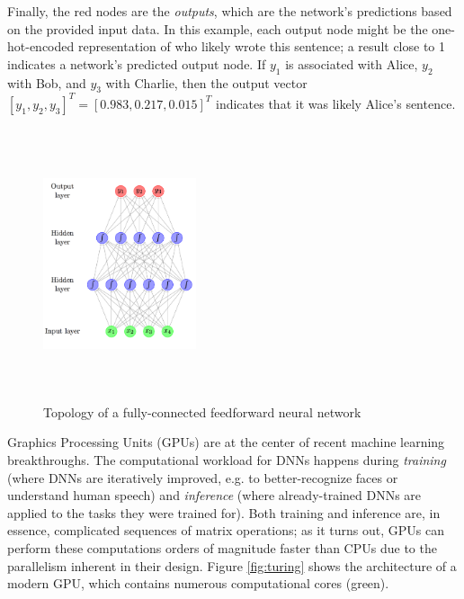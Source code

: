 \documentclass[12pt,letterpaper]{article}
\begin{document}
Finally, the red nodes are the \textit{outputs}, which are the network's predictions based on the provided input data. In this example, each output node might be the one-hot-encoded representation of who likely wrote this sentence; a result close to 1 indicates a network's predicted output node. If $y_1$ is associated with Alice, $y_2$ with Bob, and $y_3$ with Charlie, then the output vector $[y_1,y_2,y_3]^T = [0.983,0.217,0.015]^T$ indicates that it was likely Alice's sentence.

\begin{figure}[ht]
\centering
\includegraphics[width=0.4\textwidth,height=8cm]{neural_network_machinelearningmastery.png}
\captionsetup{width=0.7\linewidth}
\caption{ Topology of a fully-connected feedforward neural network \cite{feedforward_pic}}
\label{fig:feedforwardNN}
\end{figure}

Graphics Processing Units (GPUs) are at the center of recent machine learning breakthroughs. The computational workload for DNNs happens during \textit{training} (where DNNs are iteratively improved, e.g. to better-recognize faces or understand human speech) and \textit{inference}  (where already-trained DNNs are applied to the tasks they were trained for). Both training and inference are, in essence, complicated sequences of matrix operations; as it turns out, GPUs can perform these computations orders of magnitude faster than CPUs due to the parallelism inherent in their design. Figure \ref{fig:turing} shows the architecture of a modern GPU, which contains numerous computational cores (green).
\end{document}
